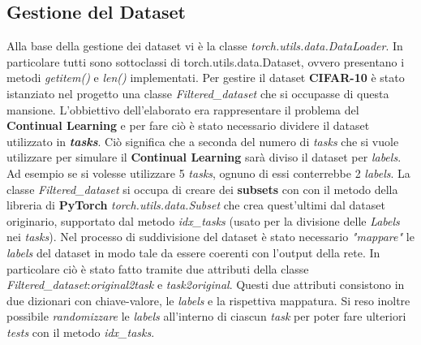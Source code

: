 \subsection{Gestione del Dataset}
Alla base della gestione dei \textbf{}{dataset} vi è la classe \textit{torch.utils.data.DataLoader}.
In particolare tutti  sono sottoclassi di torch.utils.data.Dataset, ovvero presentano  i metodi \textit{getitem()} e \textit{len()} implementati.
\newline
Per gestire il dataset \textbf{CIFAR-10} è stato istanziato nel progetto una classe \textit{Filtered\_dataset} che si occupasse di questa mansione.
L'obbiettivo dell'elaborato era rappresentare il problema del \textbf{Continual Learning} e per fare ciò è stato necessario dividere il dataset utilizzato in \textbf{\textit{tasks}}.
Ciò significa che a seconda del numero di \textit{tasks} che si vuole utilizzare per simulare il \textbf{Continual Learning}
sarà diviso il dataset per \textit{labels}. Ad esempio se si volesse utilizzare 5 \textit{tasks},  ognuno di essi conterrebbe 2 \textit{labels}.\newline
La classe \textit{Filtered\_dataset} si occupa di creare dei \textbf{subsets} con con il metodo della libreria di \textbf{PyTorch} \textit{torch.utils.data.Subset} che crea quest'ultimi dal dataset originario, supportato dal metodo \textit{idx\_tasks} (usato per la divisione delle \textit{Labels} nei \textit{tasks}).
Nel processo di suddivisione del dataset è stato necessario \textit{"mappare"} le \textit{labels} del dataset in modo tale da essere coerenti con l'output della rete. In particolare ciò è stato fatto tramite due attributi della classe \textit{Filtered\_dataset}:\textit{original2task} e \textit{task2original}. Questi due attributi consistono in due dizionari con chiave-valore, le \textit{labels} e la rispettiva mappatura.
Si reso inoltre possibile \textit{randomizzare} le \textit{labels} all'interno di ciascun \textit{task} per poter fare ulteriori \textit{tests} con il metodo \textit{idx\_tasks}.
\newline
